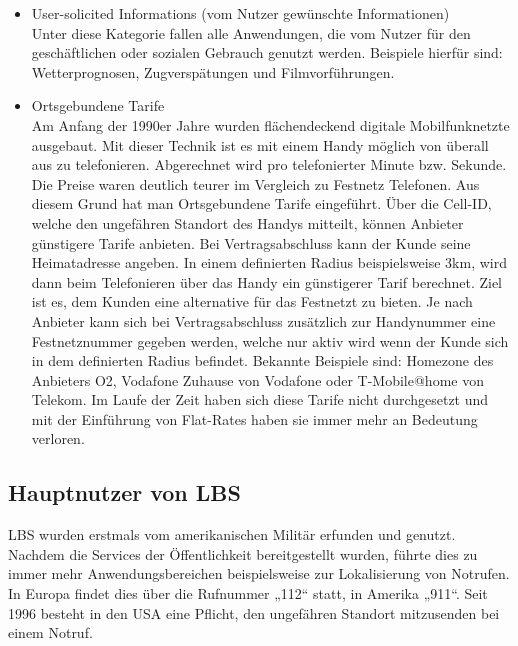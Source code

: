 \begin{itemize}
	\item User-solicited Informations (vom Nutzer gewünschte Informationen)\\
Unter diese Kategorie fallen alle Anwendungen, die vom Nutzer für den geschäftlichen oder sozialen Gebrauch genutzt werden. Beispiele hierfür sind: Wetterprognosen, Zugverspätungen und Filmvorführungen.
	\item Ortsgebundene Tarife\\
	Am Anfang der 1990er Jahre wurden flächendeckend digitale Mobilfunknetzte ausgebaut. Mit dieser Technik ist es mit einem Handy möglich von überall aus zu telefonieren. Abgerechnet wird pro telefonierter Minute bzw. Sekunde. Die Preise waren deutlich teurer im Vergleich zu Festnetz Telefonen. Aus diesem Grund hat man Ortsgebundene Tarife eingeführt. Über die Cell-ID, welche den ungefähren Standort des Handys mitteilt, können Anbieter günstigere Tarife anbieten. Bei Vertragsabschluss kann der Kunde seine Heimatadresse angeben. In einem definierten Radius beispielsweise 3km, wird dann beim Telefonieren über das Handy ein günstigerer Tarif berechnet. Ziel ist es, dem Kunden eine alternative für das Festnetzt zu bieten. Je nach Anbieter kann sich bei Vertragsabschluss zusätzlich zur Handynummer eine Festnetznummer gegeben werden, welche nur aktiv wird wenn der Kunde sich in dem definierten Radius befindet. Bekannte Beispiele sind: Homezone des Anbieters O2, Vodafone Zuhause von Vodafone oder T-Mobile@home von Telekom. Im Laufe der Zeit haben sich diese Tarife nicht durchgesetzt und mit der Einführung von Flat-Rates haben sie immer mehr an Bedeutung verloren.
\end{itemize}


\subsection{Hauptnutzer von LBS}

LBS wurden erstmals vom amerikanischen Militär erfunden und genutzt. Nachdem die Services der Öffentlichkeit bereitgestellt wurden, führte dies zu immer mehr Anwendungsbereichen beispielsweise zur Lokalisierung von Notrufen. In Europa findet dies über die Rufnummer „112“ statt, in Amerika „911“.  Seit 1996 besteht in den USA eine Pflicht, den ungefähren Standort mitzusenden bei einem Notruf. 

